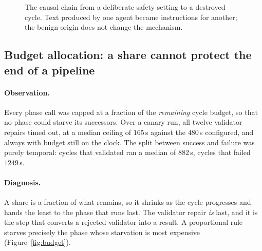 \documentclass[11pt,a4paper]{article}
\newcommand{\code}[1]{\texttt{\small #1}}
\begin{document}
\begin{figure}[t]
\centering
{}
\caption{The causal chain from a deliberate safety setting to a destroyed cycle.
Text produced by one agent became instructions for another; the benign origin
does not change the mechanism.}
\label{fig:injection}
\end{figure}

\subsection{Budget allocation: a share cannot protect the end of a pipeline}
\label{sec:budget}

\paragraph{Observation.} Every phase call was capped at a fraction of the
\emph{remaining} cycle budget, so that no phase could starve its successors.
Over a canary run, all twelve validator repairs timed out, at a median ceiling
of $165$\,s against the $480$\,s configured, and always with budget still on the
clock. The split between success and failure was purely temporal: cycles that
validated ran a median of $882$\,s, cycles that failed $1249$\,s.

\paragraph{Diagnosis.} A share is a fraction of what remains, so it shrinks as
the cycle progresses and hands the least to the phase that runs last. The
validator repair \emph{is} last, and it is the step that converts a rejected
validator into a result. A proportional rule starves precisely the phase whose
starvation is most expensive (Figure~\ref{fig:budget}).
\end{document}
